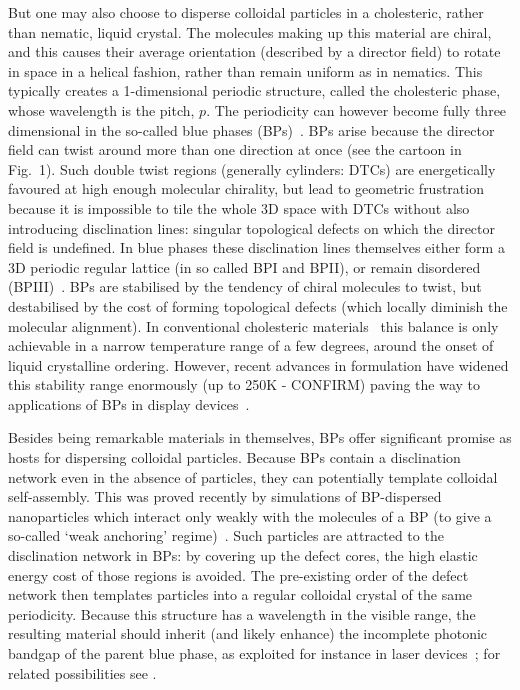 \documentclass[12pt]{article}
\begin{document}
But one may also choose to disperse colloidal particles in a cholesteric, 
rather than nematic, liquid crystal. The molecules making up this material are
chiral, and this causes their average orientation (described by a director field) to rotate in space in
a helical fashion, rather than remain uniform as in nematics. 
This typically creates a 1-dimensional periodic structure, called the cholesteric phase, whose wavelength 
is the pitch, $p$. The periodicity can however become fully three dimensional in the so-called blue phases (BPs)~\cite{mermin}. BPs arise because the director field can twist around more than one direction at once (see 
the cartoon in Fig.~1). Such double twist 
regions (generally cylinders: DTCs) are energetically favoured at high enough molecular chirality, but
lead to geometric frustration because it is impossible to tile the whole 3D
space with DTCs without also introducing disclination lines: singular topological defects on which the director field is undefined. In blue phases these disclination lines themselves either form a 3D periodic regular lattice (in so called BPI and BPII), or remain disordered (BPIII)~\cite{bp3}. 
%
BPs are stabilised by
the tendency of chiral molecules to twist, but destabilised by the
cost of forming topological defects (which locally diminish the molecular alignment). In conventional cholesteric materials~\cite{mermin} this balance is only achievable in a narrow temperature range of a few degrees, around the onset of liquid crystalline ordering. However, recent advances in formulation have widened this stability range enormously (up to 250K - CONFIRM) paving the way to
applications of BPs in display devices~\cite{kikuchi,coleswidetrange,bpdevice}.

Besides being remarkable materials in themselves, BPs offer significant promise as hosts for dispersing colloidal particles. Because BPs contain a disclination network even in the absence of
particles, they can potentially template colloidal self-assembly. 
This was proved recently by simulations of BP-dispersed nanoparticles which interact only weakly with the molecules of a BP (to give a so-called `weak anchoring' regime)~\cite{miha}. Such particles are attracted to the disclination network in BPs: by covering up the defect cores, the high elastic energy cost of those regions is avoided. The pre-existing order of the defect network then templates particles into a regular colloidal crystal of the same periodicity. 
Because this structure has a wavelength in the visible range, 
the resulting material should inherit (and likely enhance) the incomplete photonic bandgap of the parent blue phase, as exploited for instance in laser devices~\cite{bplasers}; for related possibilities see \cite{lavrentovich}.
\end{document}
